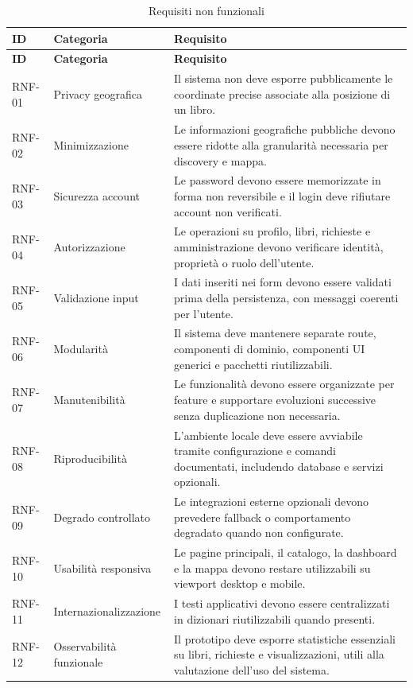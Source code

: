 \begin{longtable}{p{}p{}p{}}
    \caption{Requisiti non funzionali}
    \label{tab:requisiti-non-funzionali} \\
    \toprule
    \textbf{ID} & \textbf{Categoria} & \textbf{Requisito} \\
    \midrule
    \endfirsthead
    \toprule
    \textbf{ID} & \textbf{Categoria} & \textbf{Requisito} \\
    \midrule
    \endhead
    RNF-01 & Privacy geografica & Il sistema non deve esporre pubblicamente le coordinate precise associate alla posizione di un libro. \\
    RNF-02 & Minimizzazione & Le informazioni geografiche pubbliche devono essere ridotte alla granularità necessaria per discovery e mappa. \\
    RNF-03 & Sicurezza account & Le password devono essere memorizzate in forma non reversibile e il login deve rifiutare account non verificati. \\
    RNF-04 & Autorizzazione & Le operazioni su profilo, libri, richieste e amministrazione devono verificare identità, proprietà o ruolo dell'utente. \\
    RNF-05 & Validazione input & I dati inseriti nei form devono essere validati prima della persistenza, con messaggi coerenti per l'utente. \\
    RNF-06 & Modularità & Il sistema deve mantenere separate route, componenti di dominio, componenti UI generici e pacchetti riutilizzabili. \\
    RNF-07 & Manutenibilità & Le funzionalità devono essere organizzate per feature e supportare evoluzioni successive senza duplicazione non necessaria. \\
    RNF-08 & Riproducibilità & L'ambiente locale deve essere avviabile tramite configurazione e comandi documentati, includendo database e servizi opzionali. \\
    RNF-09 & Degrado controllato & Le integrazioni esterne opzionali devono prevedere fallback o comportamento degradato quando non configurate. \\
    RNF-10 & Usabilità responsiva & Le pagine principali, il catalogo, la dashboard e la mappa devono restare utilizzabili su viewport desktop e mobile. \\
    RNF-11 & Internazionalizzazione & I testi applicativi devono essere centralizzati in dizionari riutilizzabili quando presenti. \\
    RNF-12 & Osservabilità funzionale & Il prototipo deve esporre statistiche essenziali su libri, richieste e visualizzazioni, utili alla valutazione dell'uso del sistema. \\
    \bottomrule
\end{longtable}

